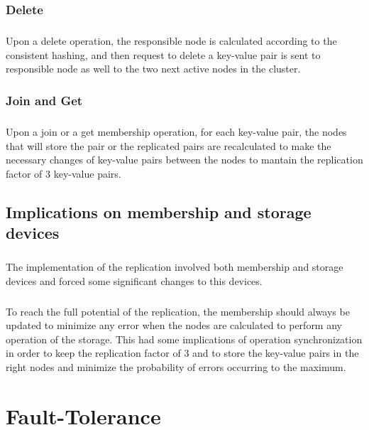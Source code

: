 \documentclass{report}
\begin{document}
				\subsection{Delete}
					\paragraph{} Upon a delete operation, the responsible node is calculated
					according to the consistent hashing, and then request to delete a
					key-value pair is sent to responsible node as well to the two next 
					active nodes in the cluster.

				\subsection{Join and Get}
					\paragraph{} Upon a join or a get membership operation, for each key-value 
					pair, the nodes that will store the pair or the replicated pairs are
					recalculated to make the necessary changes of key-value pairs between
					the nodes to mantain the replication factor of 3 key-value pairs.

			\section{Implications on membership and storage devices}
	
				\paragraph{} The implementation of the replication involved both membership
				and storage devices and forced some significant changes to this devices.
				
				\paragraph{} To reach the full potential of the replication, the membership
				should always be updated to minimize any error when the nodes are calculated
				to perform any operation of the storage. This had some implications of
				operation synchronization in order to keep the replication factor of
				3 and to store the key-value pairs in the right nodes and minimize the 
				probability of errors occurring to the maximum.

	\chapter{Fault-Tolerance}
	
\end{document}
